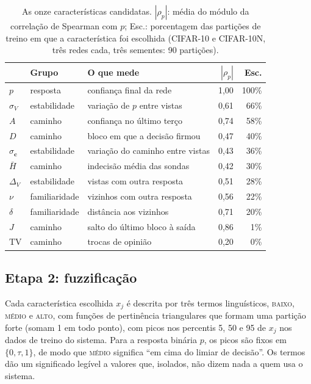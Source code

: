 \documentclass[conference,a4paper]{IEEEtran}
\newcommand{\term}[1]{\textsc{#1}}
\begin{document}
\begin{table}[t]
\centering
\caption{As onze características candidatas. $|\rho_p|$: média do módulo da correlação de Spearman com $p$;
Esc.: porcentagem das partições de treino em que a característica foi escolhida
(CIFAR-10 e CIFAR-10N, três redes cada, três sementes: 90 partições).}
\label{tab:features}
\footnotesize
\setlength{\tabcolsep}{3pt}
\begin{tabular}{@{}llp{3.1cm}rr@{}}
\toprule
 & Grupo & O que mede & $|\rho_p|$ & Esc. \\
\midrule
$p$ & resposta & confiança final da rede & 1,00 & 100\% \\
$\sigma_V$ & estabilidade & variação de $p$ entre vistas & 0,61 & 66\% \\
$A$ & caminho & confiança no último terço & 0,74 & 58\% \\
$D$ & caminho & bloco em que a decisão firmou & 0,47 & 40\% \\
$\sigma_{\mathbf c}$ & estabilidade & variação do caminho entre vistas & 0,43 & 36\% \\
$\bar H$ & caminho & indecisão média das sondas & 0,42 & 30\% \\
$\Delta_V$ & estabilidade & vistas com outra resposta & 0,51 & 28\% \\
$\nu$ & familiaridade & vizinhos com outra resposta & 0,56 & 22\% \\
$\delta$ & familiaridade & distância aos vizinhos & 0,71 & 20\% \\
$J$ & caminho & salto do último bloco à saída & 0,86 & 1\% \\
$\mathrm{TV}$ & caminho & trocas de opinião & 0,20 & 0\% \\
\bottomrule
\end{tabular}
\end{table}

\subsection{Etapa 2: fuzzificação}
Cada característica escolhida $x_j$ é descrita por três termos linguísticos, \term{baixo}, \term{médio} e \term{alto}, com funções de
pertinência triangulares que formam uma partição forte (somam 1 em todo ponto), com picos nos percentis 5, 50 e 95 de $x_j$ nos dados de
treino do sistema. Para a resposta binária $p$, os picos são fixos em $\{0, \tau, 1\}$, de modo que \term{médio} significa ``em cima do
limiar de decisão''. Os termos dão um significado legível a valores que, isolados, não dizem nada a quem usa o sistema.
\end{document}
